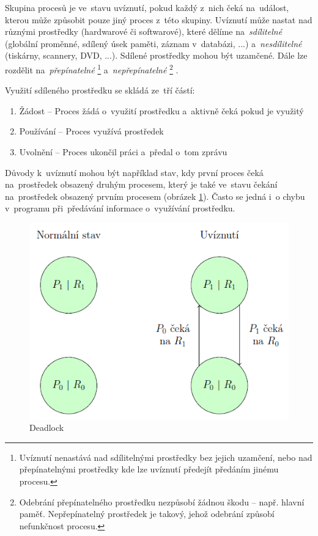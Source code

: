 Skupina procesů je ve~stavu uvíznutí, pokud každý z~nich čeká na~událost, kterou může způsobit pouze jiný proces z~této skupiny. Uvíznutí může nastat nad různými prostředky (hardwarové či softwarové), které dělíme na~\emph{sdílitelné} (globální proměnné, sdílený úsek paměti, záznam v~databázi, ...) a~\emph{nesdílitelné} (tiskárny, scannery, DVD, ...). Sdílené prostředky mohou být uzamčené. Dále lze rozdělit na~\emph{přepínatelné}%
\footnote{Uvíznutí nenastává nad sdílitelnými prostředky bez jejich uzamčení, nebo nad přepínatelnými prostředky kde lze uvíznutí předejít předáním jinému procesu.}%
 a~\emph{nepřepínatelné}%
\footnote{Odebrání přepínatelného prostředku nezpůsobí žádnou škodu -- např. hlavní paměť. Nepřepínatelný prostředek je takový, jehož odebrání způsobí nefunkčnost procesu.}%
.

Využití sdíleného prostředku se skládá ze~tří částí:

\begin{enumerate}[noitemsep]
	\item Žádost -- Proces žádá o~využití prostředku a~aktivně čeká pokud je využitý
	\item Používání -- Proces využívá prostředek
	\item Uvolnění -- Proces ukončil práci a~předal o~tom zprávu
\end{enumerate}

Důvody k~uvíznutí mohou být například stav, kdy první proces čeká na~prostředek obsazený druhým procesem, který je také ve~stavu čekání na~prostředek obsazený prvním procesem (obrázek \ref{proc_deadlock}). Často se jedná i~o chybu v~programu při~předávání informace o~využívání prostředku.

\begin{figure}[ht]
	\centering
	\includegraphics[scale=0.5]{images/proc_deadlock.png}
	\caption{Deadlock}
	\label{proc_deadlock}
\end{figure}

